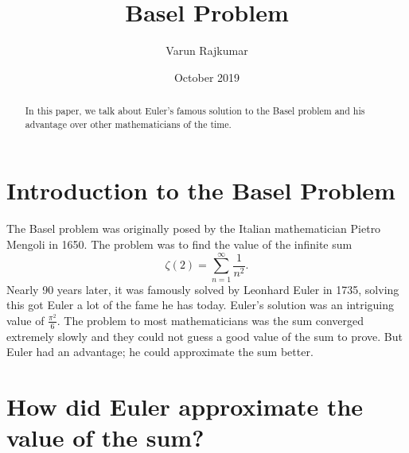 \documentclass{article}
\title{Basel Problem}
\author{Varun Rajkumar}
\date{October 2019}
\theoremstyle{remark}
\theoremstyle{definition}
\begin{document}
\maketitle
\begin{abstract}
    In this paper, we talk about Euler's famous solution to the Basel problem and his advantage over other mathematicians of the time.
\end{abstract}
\section{Introduction to the Basel Problem}
The Basel problem was originally posed by the Italian mathematician Pietro Mengoli in 1650. The problem was to find the value of the infinite sum
    \[\zeta(2)=\sum_{n=1}^{\infty}\frac{1}{n^2}.\]
Nearly 90 years later, it was famously solved by Leonhard Euler in 1735, solving this got Euler a lot of the fame he has today. Euler's solution was an intriguing value of  $\frac{\pi^2}{6}$. The problem to most mathematicians was the sum converged extremely slowly and they could not guess a good value of the sum to prove. But Euler had an advantage; he could approximate the sum better.
\section{How did Euler approximate the value of the sum?}
\end{document}
